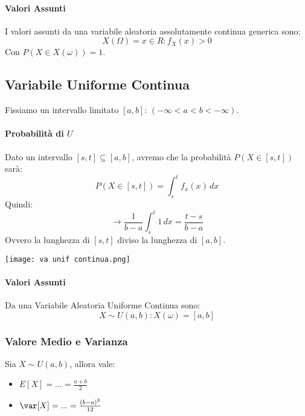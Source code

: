 	\paragraph{Valori Assunti}
	I valori assunti da una variabile aleatoria assolutamente continua generica sono:
	\[
		X(\Omega) = {x \in R: f_X(x) > 0}
	\]
	Con $P(X\in X(\omega))=1$.


	\subsection{Variabile Uniforme Continua}
	Fissiamo un intervallo limitato $[a, b]$: $(-\infty < a < b < -\infty)$.
	\paragraph{Probabilità di $U$}
	Dato un intervallo $[s, t] \subseteq [a, b]$, avremo che la probabilità $P(X \in [s,t])$ sarà:
	\[
		P(X \in [s,t]) = \int_s^t f_x (x) \,dx
	\]
	Quindi:
	\[
		\to \frac{1}{b -a} \int_s^t 1 \,dx = \frac{t-s}{b-a}
	\]
	Ovvero la lunghezza di $[s,t]$ diviso la lunghezza di $[a,b]$.
	\begin{center}
		\texttt{[image: va unif continua.png]}
	\end{center}

	\paragraph{Valori Assunti} Da una Variabile Aleatoria Uniforme Continua sono:
	\[
		X\sim U(a,b) : X(\omega) = [a,b]
	\]

	\subsubsection*{Valore Medio e Varianza}
	Sia $X\sim U(a,b)$, allora vale:
	\begin{itemize}
		\item $E[X] = ... = \frac{a+b}{2}$
		\item $\var[X] = ... = \frac{(b-a)^2}{12}$
	\end{itemize}

